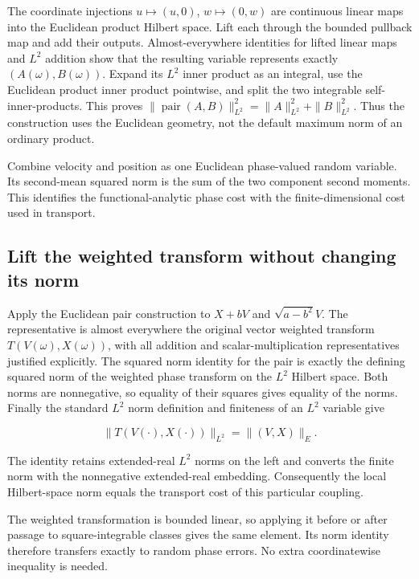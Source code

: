\documentclass[11pt,a4paper]{report}
\begin{document}
The coordinate injections \(u\mapsto(u,0)\), \(w\mapsto(0,w)\) are continuous linear maps into the Euclidean product Hilbert space. Lift each through the bounded pullback map and add their outputs. Almost-everywhere identities for lifted linear maps and \(L^{2}\) addition show that the resulting variable represents exactly \((A(\omega),B(\omega))\). Expand its \(L^{2}\) inner product as an integral, use the Euclidean product inner product pointwise, and split the two integrable self-inner-products. This proves \(\|\operatorname{pair}(A,B)\|_{L^2}^2=\|A\|_{L^2}^2+\|B\|_{L^2}^2\). Thus the construction uses the Euclidean geometry, not the default maximum norm of an ordinary product.



Combine velocity and position as one Euclidean phase-valued random variable. Its second-mean squared norm is the sum of the two component second moments. This identifies the functional-analytic phase cost with the finite-dimensional cost used in transport.

\subsection{\texorpdfstring{Lift the weighted transform without changing its norm}{Lift the weighted transform without changing its norm}}
\label{report-step-KineticLangevin-LpWeightedGeometry-lean-2}


Apply the Euclidean pair construction to \(X+bV\) and \(\sqrt{a-b^2}V\). The representative is almost everywhere the original vector weighted transform \(T(V(\omega),X(\omega))\), with all addition and scalar-multiplication representatives justified explicitly. The squared norm identity for the pair is exactly the defining squared norm of the weighted phase transform on the \(L^{2}\) Hilbert space. Both norms are nonnegative, so equality of their squares gives equality of the norms. Finally the standard \(L^{2}\) norm definition and finiteness of an \(L^{2}\) variable give

\[\|T(V(\cdot),X(\cdot))\|_{L^2}=\|(V,X)\|_E.\]

The identity retains extended-real \(L^{2}\) norms on the left and converts the finite norm with the nonnegative extended-real embedding. Consequently the local Hilbert-space norm equals the transport cost of this particular coupling.



The weighted transformation is bounded linear, so applying it before or after passage to square-integrable classes gives the same element. Its norm identity therefore transfers exactly to random phase errors. No extra coordinatewise inequality is needed.
\end{document}
